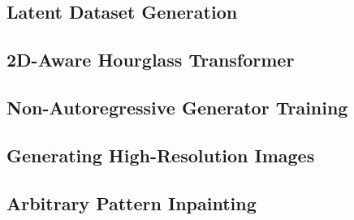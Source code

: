 \subsection{Latent Dataset Generation}

\subsection{2D-Aware Hourglass Transformer}

\subsection{Non-Autoregressive Generator Training}

\subsection{Generating High-Resolution Images}

\subsection{Arbitrary Pattern Inpainting}
